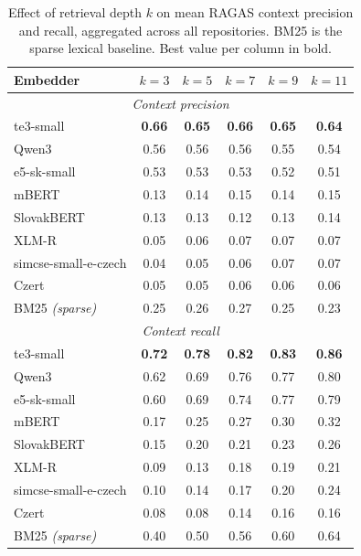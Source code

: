 \begin{table}[H]
\centering
\caption{Effect of retrieval depth $k$ on mean RAGAS context precision and recall, aggregated across all repositories. BM25 is the sparse lexical baseline. Best value per column in bold.}
\label{tab:topk}
\scriptsize
\setlength{\tabcolsep}{5pt}
\begin{tabular}{lccccc}
\hline
\textbf{Embedder} & \textbf{$k{=}3$} & \textbf{$k{=}5$} & \textbf{$k{=}7$} & \textbf{$k{=}9$} & \textbf{$k{=}11$} \\
\hline
\multicolumn{6}{c}{\textit{Context precision}} \\
\hline
te3-small & \textbf{0.66} & \textbf{0.65} & \textbf{0.66} & \textbf{0.65} & \textbf{0.64} \\
Qwen3 & 0.56 & 0.56 & 0.56 & 0.55 & 0.54 \\
e5-sk-small & 0.53 & 0.53 & 0.53 & 0.52 & 0.51 \\
mBERT & 0.13 & 0.14 & 0.15 & 0.14 & 0.15 \\
SlovakBERT & 0.13 & 0.13 & 0.12 & 0.13 & 0.14 \\
XLM-R & 0.05 & 0.06 & 0.07 & 0.07 & 0.07 \\
simcse-small-e-czech & 0.04 & 0.05 & 0.06 & 0.07 & 0.07 \\
Czert & 0.05 & 0.05 & 0.06 & 0.06 & 0.06 \\
\hline
BM25 \textit{(sparse)} & 0.25 & 0.26 & 0.27 & 0.25 & 0.23 \\
\hline
\multicolumn{6}{c}{\textit{Context recall}} \\
\hline
te3-small & \textbf{0.72} & \textbf{0.78} & \textbf{0.82} & \textbf{0.83} & \textbf{0.86} \\
Qwen3 & 0.62 & 0.69 & 0.76 & 0.77 & 0.80 \\
e5-sk-small & 0.60 & 0.69 & 0.74 & 0.77 & 0.79 \\
mBERT & 0.17 & 0.25 & 0.27 & 0.30 & 0.32 \\
SlovakBERT & 0.15 & 0.20 & 0.21 & 0.23 & 0.26 \\
XLM-R & 0.09 & 0.13 & 0.18 & 0.19 & 0.21 \\
simcse-small-e-czech & 0.10 & 0.14 & 0.17 & 0.20 & 0.24 \\
Czert & 0.08 & 0.08 & 0.14 & 0.16 & 0.16 \\
\hline
BM25 \textit{(sparse)} & 0.40 & 0.50 & 0.56 & 0.60 & 0.64 \\
\hline
\end{tabular}
\end{table}